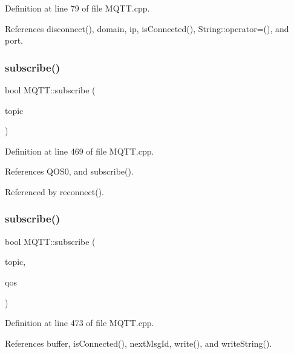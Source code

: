 Definition at line 79 of file M\+Q\+T\+T.\+cpp.



References disconnect(), domain, ip, is\+Connected(), String\+::operator=(), and port.

\mbox{\label{class_m_q_t_t_aad37921199d922122e1d390883ab6591}} 
\subsubsection{\texorpdfstring{subscribe()}{subscribe()}\hspace{0.1cm}{\footnotesize\ttfamily [1/2]}}
{\footnotesize\ttfamily bool M\+Q\+T\+T\+::subscribe (\begin{DoxyParamCaption}\item[{const char $\ast$}]{topic }\end{DoxyParamCaption})}



Definition at line 469 of file M\+Q\+T\+T.\+cpp.



References Q\+O\+S0, and subscribe().



Referenced by reconnect().

\mbox{\label{class_m_q_t_t_ac619e73524dcc0aa2c70ae160d7b6689}} 
\subsubsection{\texorpdfstring{subscribe()}{subscribe()}\hspace{0.1cm}{\footnotesize\ttfamily [2/2]}}
{\footnotesize\ttfamily bool M\+Q\+T\+T\+::subscribe (\begin{DoxyParamCaption}\item[{const char $\ast$}]{topic,  }\item[{\hyperlink{class_m_q_t_t_aff501e08e20ebf26b3272fcc0e7215ff}{E\+M\+Q\+T\+T\+\_\+\+Q\+OS}}]{qos }\end{DoxyParamCaption})}



Definition at line 473 of file M\+Q\+T\+T.\+cpp.



References buffer, is\+Connected(), next\+Msg\+Id, write(), and write\+String().



